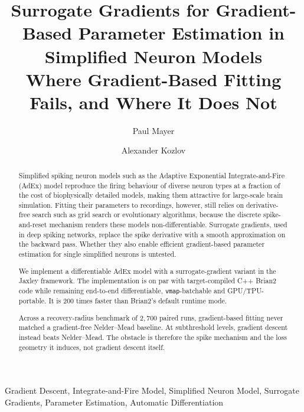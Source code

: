\documentclass[twocolumn]{theme/bioRxiv}
\begin{document}

\title{Surrogate Gradients for Gradient-Based Parameter Estimation in Simplified Neuron Models\\[0.4em]
{\Large\mdseries Where Gradient-Based Fitting Fails, and Where It Does Not}}

\author[1,\Letter]{Paul Mayer}
\author[1]{Alexander Kozlov}
\date{}

\maketitle

\begin{abstract}
Simplified spiking neuron models such as the Adaptive Exponential Integrate-and-Fire (AdEx)
model reproduce the firing behaviour of diverse neuron types at a fraction of the cost of biophysically detailed models,
making them attractive for large-scale brain simulation.
Fitting their parameters to recordings, however, still relies on derivative-free search such as grid search or
evolutionary algorithms, because the discrete spike-and-reset mechanism renders these models non-differentiable.
Surrogate gradients, used in deep spiking networks, replace the spike derivative with a smooth approximation on the backward pass.
Whether they also enable efficient gradient-based parameter estimation for single simplified neurons is untested.

We implement a differentiable AdEx model with a surrogate-gradient variant in the Jaxley framework.
The implementation is on par with target-compiled C++ Brian2 code while remaining end-to-end differentiable, \texttt{vmap}-batchable and GPU/TPU-portable.
It is 200 times faster than Brian2's default runtime mode.

Across a recovery-radius benchmark of $2{,}700$ paired runs,
gradient-based fitting never matched a gradient-free Nelder--Mead baseline.
At subthreshold levels, gradient descent instead beats Nelder--Mead.
The obstacle is therefore the spike mechanism and the loss geometry it induces, not gradient descent itself.
\end{abstract}

\begin{keywords}
Gradient Descent, Integrate-and-Fire Model, Simplified Neuron Model, Surrogate Gradients, Parameter Estimation, Automatic Differentiation
\end{keywords}
\end{document}
